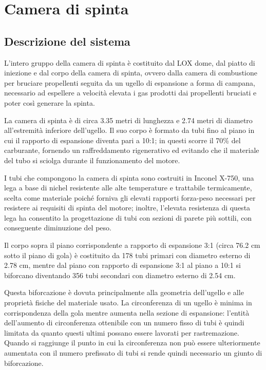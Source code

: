 \section{Camera di spinta}
\label{sec:camera spinta}

\subsection{Descrizione del sistema}
\label{subsec:descrizione camera spinta}

L’intero gruppo della camera di spinta è costituito dal LOX dome, dal piatto di iniezione e dal corpo della camera di spinta, ovvero dalla camera di combustione per bruciare propellenti seguita da un ugello di espansione a forma di campana, necessario ad espellere a velocità elevata i gas prodotti dai propellenti bruciati e poter così generare la spinta.

La camera di spinta è di circa 3.35 metri di lunghezza e 2.74 metri di diametro all'estremità inferiore dell'ugello. Il suo corpo è formato da tubi fino al piano in cui il rapporto di espansione diventa pari a 10:1; in questi scorre il 70\% del carburante, fornendo un raffreddamento rigenerativo ed evitando che il materiale del tubo si sciolga durante il funzionamento del motore.

I tubi che compongono la camera di spinta sono costruiti in Inconel X-750, una lega a base di nichel resistente alle alte temperature e trattabile termicamente, scelta come materiale poiché forniva gli elevati rapporti forza-peso necessari per resistere ai requisiti di spinta del motore; inoltre, l'elevata resistenza di questa lega ha consentito la progettazione di tubi con sezioni di parete più sottili, con conseguente diminuzione del peso.

Il corpo sopra il piano corrispondente a rapporto di espansione 3:1 (circa 76.2 cm sotto il piano di gola) è costituito da 178 tubi primari con diametro esterno di 2.78 cm, mentre dal piano con rapporto di espansione 3:1 al piano a 10:1 si biforcano diventando 356 tubi secondari con diametro esterno di 2.54 cm.

Questa biforcazione è dovuta principalmente alla geometria dell'ugello e alle proprietà fisiche del materiale usato. La circonferenza di un ugello è minima in corrispondenza della gola mentre aumenta nella sezione di espansione: l'entità dell'aumento di circonferenza ottenibile con un numero fisso di tubi è quindi limitata da quanto questi ultimi possano essere lavorati per rastremazione. Quando si raggiunge il punto in cui la circonferenza non può essere ulteriormente aumentata con il numero prefissato di tubi si rende quindi necessario un giunto di biforcazione.

